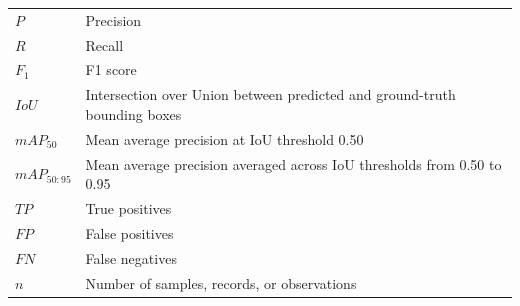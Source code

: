 
\begin{longtable}{@{}p{}p{}@{}}
$P$ & Precision \\
$R$ & Recall \\
$F_1$ & F1 score \\
$IoU$ & Intersection over Union between predicted and ground-truth bounding boxes \\
$mAP_{50}$ & Mean average precision at IoU threshold 0.50 \\
$mAP_{50:95}$ & Mean average precision averaged across IoU thresholds from 0.50 to 0.95 \\
$TP$ & True positives \\
$FP$ & False positives \\
$FN$ & False negatives \\
$n$ & Number of samples, records, or observations \\
\end{longtable}
